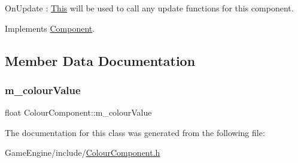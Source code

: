 On\+Update \+: \mbox{\hyperlink{class_this}{This}} will be used to call any update functions for this component. 

Implements \mbox{\hyperlink{class_component_ab71d7f4b6d8792287a9b0c9e045acbe0}{Component}}.



\subsection{Member Data Documentation}
\mbox{\label{class_colour_component_a58d3b68b7fdbf8acc74c043a05371216}} 
\subsubsection{\texorpdfstring{m\+\_\+colour\+Value}{m\_colourValue}}
{\footnotesize\ttfamily float Colour\+Component\+::m\+\_\+colour\+Value}



The documentation for this class was generated from the following file\+:\begin{DoxyCompactItemize}
\item 
Game\+Engine/include/\mbox{\hyperlink{_colour_component_8h}{Colour\+Component.\+h}}\end{DoxyCompactItemize}
